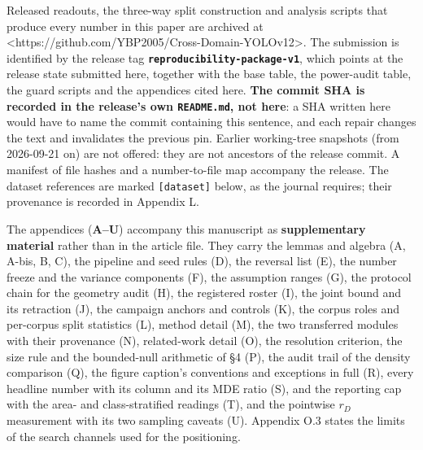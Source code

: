 \documentclass[pdflatex,sn-mathphys-ay]{sn-jnl}
\begin{document}
Released readouts, the three-way split construction and analysis scripts that produce every number in this paper are archived at \textless{}https://github.com/YBP2005/Cross-Domain-YOLOv12\textgreater{}. The submission is identified by the release tag \textbf{\texttt{reproducibility-package-v1}}, which points at the release state submitted here, together with the base table, the power-audit table, the guard scripts and the appendices cited here. \textbf{The commit SHA is recorded in the release's own \texttt{README.md}, not here}: a SHA written here would have to name the commit containing this sentence, and each repair changes the text and invalidates the previous pin. Earlier working-tree snapshots (from 2026-09-21 on) are not offered: they are not ancestors of the release commit. A manifest of file hashes and a number-to-file map accompany the release. The dataset references are marked \texttt{[dataset]} below, as the journal requires; their provenance is recorded in Appendix L.


The appendices (\textbf{A--U}) accompany this manuscript as \textbf{supplementary material} rather than in the article file. They carry the lemmas and algebra (A, A-bis, B, C), the pipeline and seed rules (D), the reversal list (E), the number freeze and the variance components (F), the assumption ranges (G), the protocol chain for the geometry audit (H), the registered roster (I), the joint bound and its retraction (J), the campaign anchors and controls (K), the corpus roles and per-corpus split statistics (L), method detail (M), the two transferred modules with their provenance (N), related-work detail (O), the resolution criterion, the size rule and the bounded-null arithmetic of \S{}4 (P), the audit trail of the density comparison (Q), the figure caption's conventions and exceptions in full (R), every headline number with its column and its MDE ratio (S), and the reporting cap with the area- and class-stratified readings (T), and the pointwise $r_D$ measurement with its two sampling caveats (U). Appendix O.3 states the limits of the search channels used for the positioning.


\end{document}
